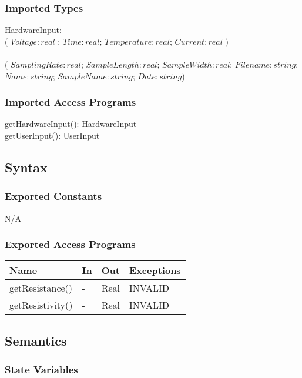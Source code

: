 \documentclass[12pt, titlepage]{article}
\begin{document}
\subsubsection{Imported Types}
HardwareInput: \\
( $Voltage: real $ ; $Time: real$; $Temperature: real$; $Current: real$ )\\

 \\
( $SamplingRate: real$; $SampleLength: real$; $SampleWidth: real$; $Filename: string$; $Name: string$; $SampleName: string$; $Date: string$)

\subsubsection{Imported Access Programs}
getHardwareInput(): HardwareInput \\
getUserInput(): UserInput

\subsection{Syntax}

\subsubsection{Exported Constants}
N/A

\subsubsection{Exported Access Programs}

\begin{center}
\begin{tabular}{p{4cm} p{2cm} p{4cm} p{2cm}}
\hline
\textbf{Name} & \textbf{In} & \textbf{Out} & \textbf{Exceptions} \\
\hline
getResistance() & - & Real & INVALID \\
getResistivity() & - & Real & INVALID \\
\hline
\end{tabular}
\end{center}

\subsection{Semantics}

\subsubsection{State Variables}
\end{document}
